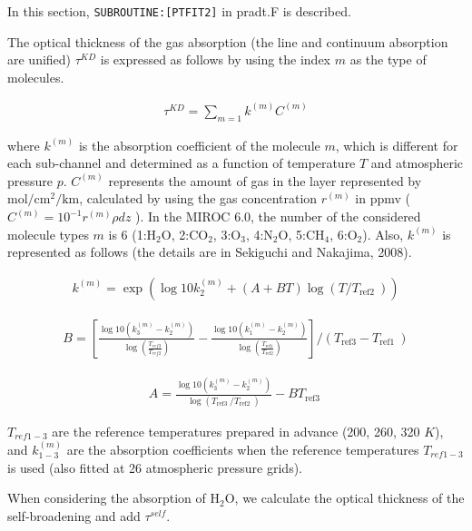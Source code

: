 In this section, \texttt{SUBROUTINE:{[}PTFIT2{]}} in pradt.F is
described.

The optical thickness of the gas absorption (the line and continuum
absorption are unified) \(\tau^{K D}\) is expressed as follows by using
the index \(m\) as the type of molecules.

\begin{eqnarray}
\tau^{KD}=\sum_{m=1} k^{(m)} C^{(m)}
\end{eqnarray}

where \(k^{(m)}\) is the absorption coefficient of the molecule \(m\),
which is different for each sub-channel and determined as a function of
temperature \(T\) and atmospheric pressure \(p\). \(C^{(m)}\) represents
the amount of gas in the layer represented by
\(\mathrm{mol} / \mathrm{cm}^{2} / \mathrm{km}\), calculated by using
the gas concentration \(r^{(m)}\) in ppmv (
\(C^{(m)}=10^{-1} r^{(m)} \rho d z\) ). In the MIROC 6.0, the number of
the considered molecule types \(m\) is 6 (1:\(\mathrm{H_2} \mathrm{O}\),
2:\(\mathrm{CO_2}\), 3:\(\mathrm{O_3}\), 4:\(\mathrm{N_2} \mathrm{O}\),
5:\(\mathrm{CH_4}\), 6:\(\mathrm{O_2}\)). Also, \(k^{(m)}\) is
represented as follows (the details are in Sekiguchi and Nakajima,
2008).

\begin{eqnarray}
k^{(m)}=\exp \left(\log 10 k_{2}^{(m)}+(A+B T) \log \left(T / T_{\text {ref2 } }\right)\right)
\end{eqnarray}

\begin{eqnarray}
B=\left[\frac{\log 10\left(k_{3}^{(m)}-k_{2}^{(m)}\right)}{\log \left(\frac{T_{r e f 3}}{T_{r e f 2}}\right)}-\frac{\log 10\left(k_{1}^{(m)}-k_{2}^{(m)}\right)}{\log \left(\frac{T_{\text {ref1} }}{T_{\text {ref2}}}\right)}\right] /\left(T_{\text {ref3}}-T_{\text {ref1 }}\right)
\end{eqnarray}

\begin{eqnarray}
A=\frac{\log 10\left(k_{3}^{(m)}-k_{2}^{(m)}\right)}{\log \left(T_{\text {ref3 } } / T_{\text {ref2 } }\right)}-B T_{\text {ref3 }}
\end{eqnarray}

\(T_{ref1-3}\) are the reference temperatures prepared in advance (200,
260, 320 \(K\)), and \(k_{1-3}^{(m)}\) are the absorption coefficients
when the reference temperatures \(T_{ref1-3}\) is used (also fitted at
26 atmospheric pressure grids).

When considering the absorption of \(\mathrm{H_2O}\), we calculate the
optical thickness of the self-broadening and add \(\tau^{self}\).

